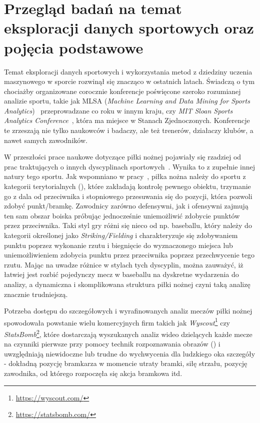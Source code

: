 
\chapter{Przegląd badań na temat eksploracji danych sportowych oraz pojęcia podstawowe}
\noindent Temat eksploracji danych sportowych i wykorzystania metod z dziedziny uczenia maszynowego w sporcie rozwinął się znacząco w ostatnich latach. Świadczą o tym chociażby organizowane corocznie konferencje poświęcone szeroko rozumianej analizie sportu, takie jak MLSA (\textit{Machine Learning and Data Mining for Sports Analytics})~\cite{MLSA20} przeprowadzane co roku w innym kraju, czy \textit{MIT Sloan Sports Analytics Conference}~\cite{MITSloan}, która ma miejsce w Stanach Zjednoczonych. Konferencje te zrzeszają nie tylko naukowców i badaczy, ale też trenerów, działaczy klubów, a nawet samych zawodników.

W przeszłości prace naukowe dotyczące piłki nożnej pojawiały się rzadziej od prac traktujących o innych dyscyplinach sportowych~\cite{ml_soccer_analytics}. Wynika to z zupełnie innej natury tego sportu. Jak wspomniano w pracy~\cite{game_classification}, piłka nożna należy do sportu z kategorii terytorialnych (), które zakładają kontrolę pewnego obiektu, trzymanie go z dala od przeciwnika i stopniowego przesuwania się do pozycji, która pozwoli zdobyć punkt/bramkę. Zawodnicy zarówno defensywni, jak i ofensywni zajmują ten sam obszar boiska próbując jednocześnie uniemożliwić zdobycie punktów przez przeciwnika. Taki styl gry różni się nieco od np. baseballu, który należy do kategorii określonej jako \textit{Striking/Fielding} i charakteryzuje się zdobywaniem punktu poprzez wykonanie rzutu i biegnięcie do wyznaczonego miejsca lub uniemożliwieniem zdobycia punktu przez przeciwnika poprzez przechwycenie tego rzutu. Mając na uwadze różnice w stylach tych dyscyplin, można zauważyć, iż łatwiej jest rozbić pojedynczy mecz w baseballu na dyskretne wydarzenia do analizy, a dynamiczna i skomplikowana struktura piłki nożnej czyni taką analizę znacznie trudniejszą.

Potrzeba dostępu do szczegółowych i wyrafinowanych analiz meczów piłki nożnej spowodowała powstanie wielu komercyjnych firm takich jak \textit{Wyscout}\footnote{\url{https://wyscout.com/}} czy \textit{StatsBomb}\footnote{\url{https://statsbomb.com/}}, które dostarczają wyszukanych analiz wideo dzielących każde mecze na czynniki pierwsze przy pomocy technik rozpoznawania obrazów () i uwzględniają niewidoczne lub trudne do wychwycenia dla ludzkiego oka szczegóły - dokładną pozycję bramkarza w momencie utraty bramki, siłę strzału, pozycję zawodnika, od którego rozpoczęła się akcja bramkowa itd.

